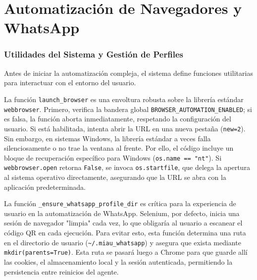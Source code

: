 \documentclass[letterpaper,12pt]{article}
\begin{document}
\section*{Automatización de Navegadores y WhatsApp}

\subsubsection{Utilidades del Sistema y Gestión de Perfiles}

Antes de iniciar la automatización compleja, el sistema define funciones utilitarias para interactuar con el entorno del usuario.

La función \texttt{launch\_browser} es una envoltura robusta sobre la librería estándar \texttt{webbrowser}. Primero, verifica la bandera global \texttt{BROWSER\_AUTOMATION\_ENABLED}; si es falsa, la función aborta inmediatamente, respetando la configuración del usuario. Si está habilitada, intenta abrir la URL en una nueva pestaña (\texttt{new=2}). Sin embargo, en sistemas Windows, la librería estándar a veces falla silenciosamente o no trae la ventana al frente. Por ello, el código incluye un bloque de recuperación específico para Windows (\texttt{os.name == "nt"}). Si \texttt{webbrowser.open} retorna \texttt{False}, se invoca \texttt{os.startfile}, que delega la apertura al sistema operativo directamente, asegurando que la URL se abra con la aplicación predeterminada.

La función \texttt{\_ensure\_whatsapp\_profile\_dir} es crítica para la experiencia de usuario en la automatización de WhatsApp. Selenium, por defecto, inicia una sesión de navegador "limpia" cada vez, lo que obligaría al usuario a escanear el código QR en cada ejecución. Para evitar esto, esta función determina una ruta en el directorio de usuario (\texttt{\textasciitilde/.miau\_whatsapp}) y asegura que exista mediante \texttt{mkdir(parents=True)}. Esta ruta se pasará luego a Chrome para que guarde allí las cookies, el almacenamiento local y la sesión autenticada, permitiendo la persistencia entre reinicios del agente.
\end{document}
